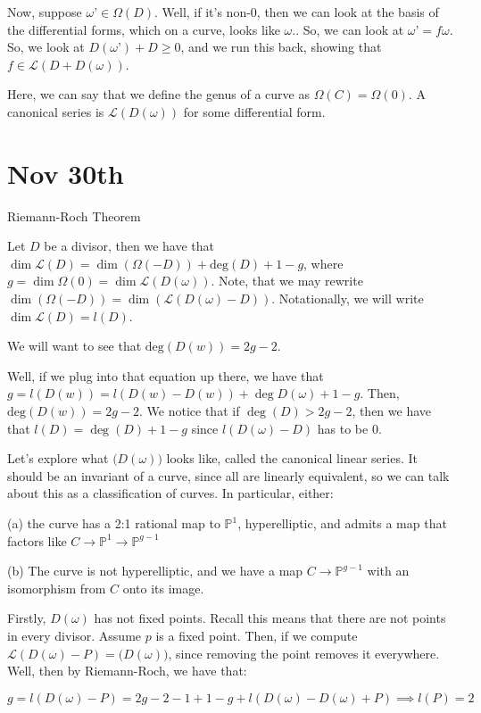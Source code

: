 \documentclass[10pt]{article}
\begin{document}
Now, suppose $\omega’ \in \Omega(D)$. Well, if it’s non-0, then we can look at the basis of the differential forms, which on a curve, looks like $\omega$.. So, we can look at $\omega’ = f\omega$. So, we look at $D(\omega’) + D \geq 0$, and we run this back, showing that $f \in \mathcal{L}(D + D(\omega))$.

Here, we can say that we define the genus of a curve as $\Omega(C) = \Omega(0)$. A canonical series is $\mathcal{L}(D(\omega))$ for some differential form.

\section{Nov 30th}

Riemann-Roch Theorem

Let $D$ be a divisor, then we have that $\dim \mathcal{L}(D) =\dim( \Omega(-D)) + \text{deg}(D)  + 1 - g$, where $g = \dim \Omega(0) = \dim \mathcal{L}(D(\omega))$. Note, that we may rewrite $ \dim( \Omega(-D))  = \dim(\mathcal{L}(D(\omega) - D))$. Notationally, we will write $\dim \mathcal{L}(D) = l(D)$.

We will want to see that $\text{deg}(D(w)) = 2g - 2$.

Well, if we plug into that equation up there, we have that $g = l(D(w)) = l(D(w) - D(w)) + \deg D(\omega) + 1 - g$. Then, $\text{deg}(D(w)) = 2g - 2$. We notice that if $\deg(D) > 2g - 2$, then we have that $l(D) = \deg(D) + 1 - g$ since $l(D(\omega) - D)$ has to be 0.

Let’s explore what $\mathcal(D(\omega))$ looks like, called the canonical linear series. It should be an invariant of a curve, since all are linearly equivalent, so we can talk about this as a classification of curves. In particular, either:

(a) the curve has a 2:1 rational map to $\mathbb{P}^1$, hyperelliptic, and admits a map that factors like $C \to \mathbb{P}^1 \to \mathbb{P}^{g-1}$

(b) The curve is not hyperelliptic, and we have a map $C \to \mathbb{P}^{g-1}$ with an isomorphism from $C$ onto its image.

Firstly, $D(\omega)$ has not fixed points. Recall this means that there are not points in every divisor. Assume $p$ is a fixed point. Then, if we compute $\mathcal{L}(D(\omega) - P) = \mathcal(D(\omega))$, since removing the point removes it everywhere. Well, then by Riemann-Roch, we have that:

$$ g = l(D(\omega) - P) = 2g - 2 - 1 + 1 - g + l(D(\omega) - D(\omega) + P) \implies l(P)  = 2$$
\end{document}
